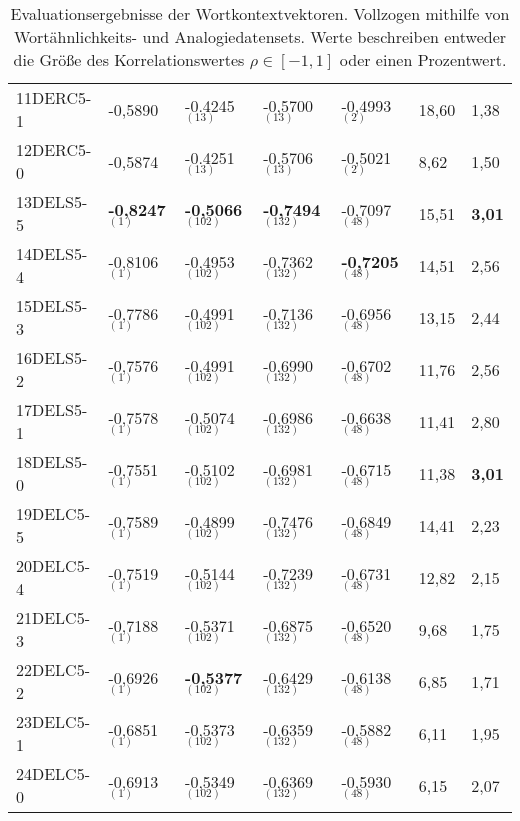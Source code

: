 \begin{table}[h]
{\begin{tabular}{@{}lllllll@{}}
    11DERC5-1   & -0,5890                  & -0.4245$_{(13)}$            & -0,5700$_{(13)}$            & -0,4993$_{(2)}$           & 18,60           & 1,38  \\
    12DERC5-0   & -0,5874                  & -0.4251$_{(13)}$            & -0,5706$_{(13)}$            & -0,5021$_{(2)}$           & 8,62            & 1,50 \\
    13DELS5-5  & \textbf{-0,8247$_{(1)}$} & \textbf{-0,5066$_{(102)}$}  & \textbf{-0,7494$_{(132)}$}  & -0,7097$_{(48)}$          & 15,51           & \textbf{3,01} \\
    14DELS5-4   & -0,8106$_{(1)}$          & -0,4953$_{(102)}$           & -0,7362$_{(132)}$           & \textbf{-0,7205$_{(48)}$} & 14,51           & 2,56 \\
    15DELS5-3    & -0,7786$_{(1)}$          & -0,4991$_{(102)}$           & -0,7136$_{(132)}$           & -0,6956$_{(48)}$          & 13,15           & 2,44 \\
    16DELS5-2   & -0,7576$_{(1)}$          & -0,4991$_{(102)}$           & -0,6990$_{(132)}$           & -0,6702$_{(48)}$          & 11,76           & 2,56 \\
    17DELS5-1  & -0,7578$_{(1)}$          & -0,5074$_{(102)}$           & -0,6986$_{(132)}$           & -0,6638$_{(48)}$          & 11,41           & 2,80 \\
    18DELS5-0 & -0,7551$_{(1)}$          & -0,5102$_{(102)}$           & -0,6981$_{(132)}$           & -0,6715$_{(48)}$          & 11,38           & \textbf{3,01} \\
    19DELC5-5   & -0,7589$_{(1)}$          & -0,4899$_{(102)}$           & -0,7476$_{(132)}$           & -0,6849$_{(48)}$          & 14,41           & 2,23 \\
    20DELC5-4    & -0,7519$_{(1)}$          & -0,5144$_{(102)}$           & -0,7239$_{(132)}$           & -0,6731$_{(48)}$          & 12,82           & 2,15 \\
    21DELC5-3   & -0,7188$_{(1)}$          & -0,5371$_{(102)}$           & -0,6875$_{(132)}$           & -0,6520$_{(48)}$          & 9,68            & 1,75 \\
    22DELC5-2  & -0,6926$_{(1)}$          & \textbf{-0,5377$_{(102)}$}  & -0,6429$_{(132)}$           & -0,6138$_{(48)}$          & 6,85            & 1,71 \\
    23DELC5-1 & -0,6851$_{(1)}$          & -0,5373$_{(102)}$           & -0,6359$_{(132)}$           & -0,5882$_{(48)}$          & 6,11            & 1,95 \\
    24DELC5-0  & -0,6913$_{(1)}$          & -0,5349$_{(102)}$           & -0,6369$_{(132)}$           & -0,5930$_{(48)}$          & 6,15            & 2,07 \\
    \bottomrule[1.25pt]
  \end{tabular}%
  }
\caption[Evaluationsergebnisse der Wortkontextvektoren]{Evaluationsergebnisse der Wortkontextvektoren. Vollzogen mithilfe
von Wortähnlichkeits- und Analogiedatensets. Werte beschreiben entweder die Größe des Korrelationswertes $\rho \in [-1, 1]$ oder
einen Prozentwert.}
\end{table}

  \restoregeometry

